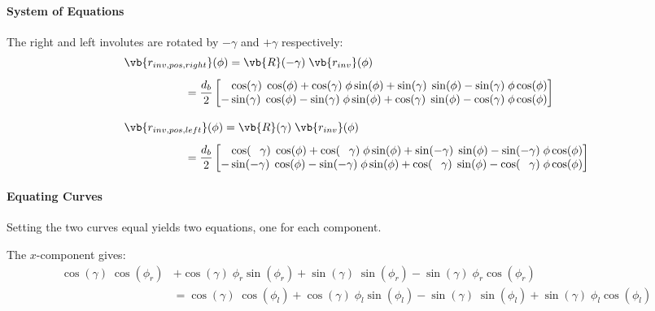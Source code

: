 \paragraph{System of Equations}
The right and left involutes are rotated by $-\gamma$ and $+\gamma$ respectively:
\begin{align}
    &\vb{r_{inv,pos,right}}(\phi) = \vb{R}(-\gamma)\;\vb{r_{inv}}(\phi)
\nonumber\\[1ex]
    &\phantom{\vb{r_{inv,po}}}= \frac{d_b}{2} \begin{bmatrix}
        \phantom{-}\cos(\gamma)\;\cos(\phi) +\cos(\gamma)\;\phi \sin(\phi) + \sin(\gamma)\;\sin(\phi) - \sin(\gamma)\;\phi\cos(\phi)\\
        -\sin(\gamma)\;\cos(\phi) - \sin(\gamma)\;\phi \sin(\phi) + \cos(\gamma)\;\sin(\phi) - \cos(\gamma)\;\phi\cos(\phi)\\
    \end{bmatrix}
\\[2ex]
    &\vb{r_{inv,pos,left}}(\phi) = \vb{R}(\gamma)\;\vb{r_{inv}}(\phi)
\nonumber\\[1ex]
    &\phantom{\vb{r_{inv,po}}} = \frac{d_b}{2}
    \begin{bmatrix}
        \phantom{-}\cos(\phantom{-}\gamma)\;\cos(\phi) +\cos(\phantom{-}\gamma)\;\phi \sin(\phi) + \sin(-\gamma)\;\sin(\phi) - \sin(-\gamma)\;\phi\cos(\phi)\\
        -\sin(-\gamma)\;\cos(\phi) - \sin(-\gamma)\;\phi \sin(\phi) + \cos(\phantom{-}\gamma)\;\sin(\phi) - \cos(\phantom{-}\gamma)\;\phi\cos(\phi)\\
    \end{bmatrix}
\end{align}

\paragraph{Equating Curves}
Setting the two curves equal yields two equations, one for each component.

The $x$-component gives:
\begin{equation}
\begin{aligned}
       \cos(\gamma)\;\cos(\phi_r) &+ \cos(\gamma)\;\phi_r\sin(\phi_r)
     + \sin(\gamma)\;\sin(\phi_r)  - \sin(\gamma)\;\phi_r\cos(\phi_r) \\
    &= \cos(\gamma)\;\cos(\phi_l)  + \cos(\gamma)\;\phi_l\sin(\phi_l) 
     - \sin(\gamma)\;\sin(\phi_l)  + \sin(\gamma)\;\phi_l\cos(\phi_l)
\end{aligned}
\end{equation}


